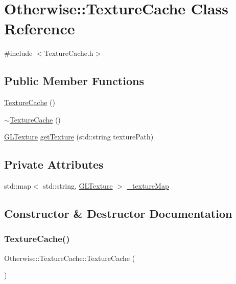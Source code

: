 \hypertarget{class_otherwise_1_1_texture_cache}{}\section{Otherwise\+:\+:Texture\+Cache Class Reference}
\label{class_otherwise_1_1_texture_cache}


{\ttfamily \#include $<$Texture\+Cache.\+h$>$}

\subsection*{Public Member Functions}
\begin{DoxyCompactItemize}
\item 
\hyperlink{class_otherwise_1_1_texture_cache_aae93e4183192cad4980d643ea3f2d54f}{Texture\+Cache} ()
\item 
\hyperlink{class_otherwise_1_1_texture_cache_a33b6ed4e486e42fc1470e02010fd008d}{$\sim$\+Texture\+Cache} ()
\item 
\hyperlink{struct_otherwise_1_1_g_l_texture}{G\+L\+Texture} \hyperlink{class_otherwise_1_1_texture_cache_ae13e1ce1875679728b62f6b08a552e39}{get\+Texture} (std\+::string texture\+Path)
\end{DoxyCompactItemize}
\subsection*{Private Attributes}
\begin{DoxyCompactItemize}
\item 
std\+::map$<$ std\+::string, \hyperlink{struct_otherwise_1_1_g_l_texture}{G\+L\+Texture} $>$ \hyperlink{class_otherwise_1_1_texture_cache_a4c5bf88213667e5af06042065e76bd64}{\+\_\+texture\+Map}
\end{DoxyCompactItemize}


\subsection{Constructor \& Destructor Documentation}
\mbox{\label{class_otherwise_1_1_texture_cache_aae93e4183192cad4980d643ea3f2d54f}} 
\subsubsection{\texorpdfstring{Texture\+Cache()}{TextureCache()}}
{\footnotesize\ttfamily Otherwise\+::\+Texture\+Cache\+::\+Texture\+Cache (\begin{DoxyParamCaption}{ }\end{DoxyParamCaption})}

